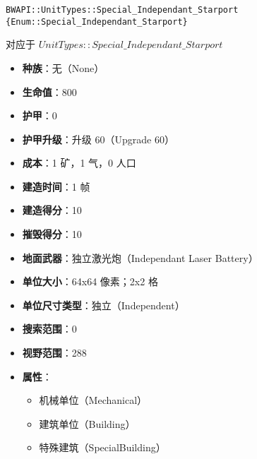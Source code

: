 \begin{tcolorbox}[colback=white, colframe=black!60!white, title=Special\_Independant\_Starport(), arc=0mm]
    \begin{verbatim}
BWAPI::UnitTypes::Special_Independant_Starport {Enum::Special_Independant_Starport}
    \end{verbatim}
    对应于  $UnitTypes::Special\_Independant\_Starport$ 
    \begin{itemize}
        \item \textbf{种族}：无（None）
        \item \textbf{生命值}：800
        \item \textbf{护甲}：0
        \item \textbf{护甲升级}：升级 60（Upgrade 60）
        \item \textbf{成本}：1 矿，1 气，0 人口
        \item \textbf{建造时间}：1 帧
        \item \textbf{建造得分}：10
        \item \textbf{摧毁得分}：10
        \item \textbf{地面武器}：独立激光炮（Independant Laser Battery）
        \item \textbf{单位大小}：64x64 像素；2x2 格
        \item \textbf{单位尺寸类型}：独立（Independent）
        \item \textbf{搜索范围}：0
        \item \textbf{视野范围}：288
        \item \textbf{属性}：
            \begin{itemize}
                \item 机械单位（Mechanical）
                \item 建筑单位（Building）
                \item 特殊建筑（SpecialBuilding）
            \end{itemize}
    \end{itemize}
\end{tcolorbox}

